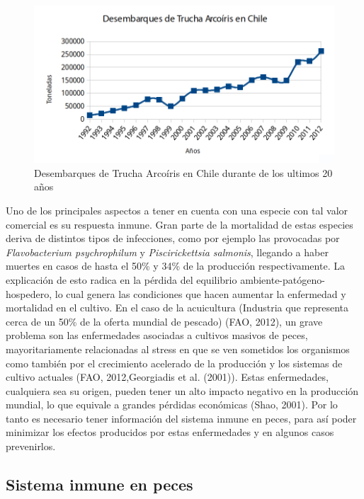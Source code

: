 \documentclass[11pt,a4paper,]{article}
\begin{document}
\begin{figure}[htbp]
\centering
\includegraphics{gfx/desembarques.png}
\caption{Desembarques de Trucha Arcoíris en Chile durante de los ultimos
20 años \label{desembarques}}
\end{figure}

Uno de los principales aspectos a tener en cuenta con una especie con
tal valor comercial es su respuesta inmune. Gran parte de la mortalidad
de estas especies deriva de distintos tipos de infecciones, como por
ejemplo las provocadas por \emph{Flavobacterium psychrophilum} y
\emph{Piscirickettsia salmonis}, llegando a haber muertes en casos de
hasta el 50\% y 34\% de la producción respectivamente. La explicación de
esto radica en la pérdida del equilibrio ambiente-patógeno-hospedero, lo
cual genera las condiciones que hacen aumentar la enfermedad y
mortalidad en el cultivo. En el caso de la acuicultura (Industria que
representa cerca de un 50\% de la oferta mundial de pescado) (FAO,
2012), un grave problema son las enfermedades asociadas a cultivos
masivos de peces, mayoritariamente relacionadas al stress en que se ven
sometidos los organismos como también por el crecimiento acelerado de la
producción y los sistemas de cultivo actuales (FAO, 2012,Georgiadis et
al. (2001))⁠⁠. Estas enfermedades, cualquiera sea su origen, pueden
tener un alto impacto negativo en la producción mundial, lo que equivale
a grandes pérdidas económicas (Shao, 2001)⁠. Por lo tanto es necesario
tener información del sistema inmune en peces, para así poder minimizar
los efectos producidos por estas enfermedades y en algunos casos
prevenirlos.

\subsection{Sistema inmune en peces}\label{sistema-inmune-en-peces}
\end{document}
